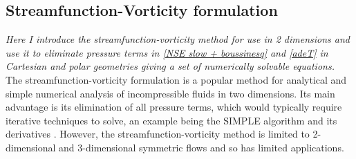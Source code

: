 \documentclass{article}
\begin{document}
\subsection*{Streamfunction-Vorticity formulation}
{\it{Here I introduce the streamfunction-vorticity method for use in 2 dimensions and use it to eliminate pressure terms in \ref{NSE slow + boussinesq} and \ref{adeT} in Cartesian and polar geometries giving a set of numerically solvable equations.}}
\vspace{0.3cm}
\newline
\noindent The streamfunction-vorticity formulation is a popular method for analytical and simple numerical analysis of incompressible fluids in two dimensions. Its main advantage is its elimination of all pressure terms, which would typically require iterative techniques to solve, an example being the SIMPLE algorithm and its derivatives \cite{earn2017investigation}. However, the streamfunction-vorticity method is limited to 2-dimensional and 3-dimensional symmetric flows and so has limited applications.
\newline
\end{document}
